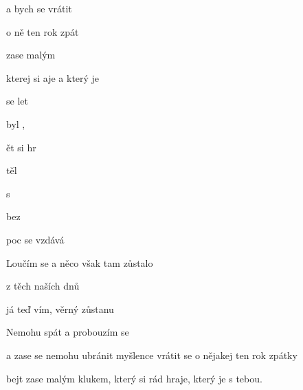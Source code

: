 

\zs
{} a  bych se vrátit

o ně ten rok zpát

 zase malým 

kterej si aje a který je  
\ks

\zs
{} se    let

 byl ,  

ět   si hr
\ks

\zs
{} těl  

 s  

     
\ks

\zr
{}  

 bez 

   poc se vzdává
\kr

\zs
Loučím se a něco však tam zůstalo

z těch naších dnů

já teď vím, věrný zůstanu
\ks

\zr  \kr

\zs
Nemohu spát a probouzím se

a zase se nemohu ubránit myšlence vrátit se o nějakej ten rok zpátky

bejt zase malým klukem, který si rád hraje, který je s tebou.
\ks

\kp






















